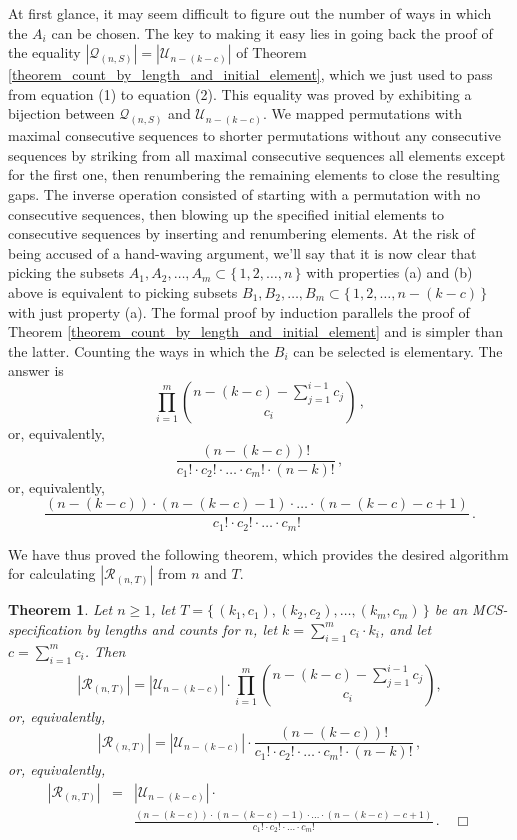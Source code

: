 \documentclass{article}
\newtheorem{theorem}{Theorem}[section]
\begin{document}
At first glance, it may seem difficult to figure out the number of ways in which the $A_i$ can be chosen.
The key to making it easy lies in going back the proof of the equality
$|{\mathcal Q}_{(n,S)}| = |{\mathcal U}_{n - (k - c)}|$ of
Theorem \ref{theorem_count_by_length_and_initial_element}, which we just used to pass from equation (1) to
equation (2). This equality was proved
by exhibiting a bijection between ${\mathcal Q}_{(n,S)}$ and ${\mathcal U}_{n - (k - c)}$.
We mapped permutations with maximal consecutive sequences to shorter permutations without any consecutive
sequences by striking from all maximal consecutive sequences all elements except for the
first one, then renumbering the remaining elements to close the resulting gaps. The inverse operation consisted of
starting with a permutation with no consecutive sequences, then
blowing up the specified initial elements to consecutive sequences by inserting and renumbering elements. At the risk
of being accused of a hand-waving argument, we'll say that it is now clear that picking the subsets
$A_1, A_2, \ldots, A_{m}\subset \{\,1, 2, \ldots, n\,\}$ with properties (a) and (b) above is equivalent to picking
subsets $B_1, B_2, \ldots, B_{m}\subset \{\,1, 2, \ldots, n - (k - c)\,\}$ with just property (a).
The formal proof by induction parallels the proof of Theorem \ref{theorem_count_by_length_and_initial_element} and
is simpler than the latter.
Counting the ways in which the $B_i$ can be selected is elementary. The answer is
$$
\prod_{i=1}^m\binom{n-(k-c) - \sum_{j=1}^{i-1}c_j}{c_i}\,,
$$
or, equivalently,
$$
\frac{(n-(k-c))!}{c_1! \cdot c_2! \cdot \ldots \cdot c_m! \cdot (n-k)!}\,,
$$
or, equivalently,
$$
\frac{(n-(k-c)) \cdot (n-(k-c) - 1)\cdot \ldots \cdot (n-(k-c) - c + 1)}{c_1! \cdot c_2! \cdot \ldots \cdot c_m!}\,.
$$

We have thus proved the following theorem, which provides the desired algorithm for calculating
$|{\mathcal R}_{(n,T)}|$ from $n$ and $T$.

\begin{theorem}\label{theorem_count_by_length_and_count}
  Let $n \geq 1$, let $T = \{\,(k_1, c_1), (k_2, c_2), \ldots,(k_m, c_m)\,\}$ be an
  MCS-specification by lengths and counts for $n$, let $k = \sum_{i=1}^m c_i \cdot k_i$,
  and let $c = \sum_{i=1}^m c_i$.
  Then
  $$
  |{\mathcal R}_{(n,T)}| = |{\mathcal U}_{n - (k - c)}| \cdot
  \prod_{i=1}^m\binom{n-(k-c) - \sum_{j=1}^{i-1}c_j}{c_i},
  $$
  or, equivalently,
  $$
  |{\mathcal R}_{(n,T)}| = |{\mathcal U}_{n - (k - c)}| \cdot
  \frac{(n-(k-c))!}{c_1! \cdot c_2! \cdot \ldots \cdot c_m! \cdot (n-k)!}\,,
  $$
  or, equivalently,
  \begin{eqnarray*}
    |{\mathcal R}_{(n,T)}| & = & |{\mathcal U}_{n - (k - c)}| \cdot \\
                           &   &
    \frac{(n-(k-c)) \cdot (n-(k-c) - 1)\cdot \ldots \cdot (n-(k-c) - c + 1)}{c_1! \cdot c_2! \cdot \ldots \cdot c_m!}\,.
    \quad \Box
  \end{eqnarray*}
 
\end{theorem}
\end{document}
